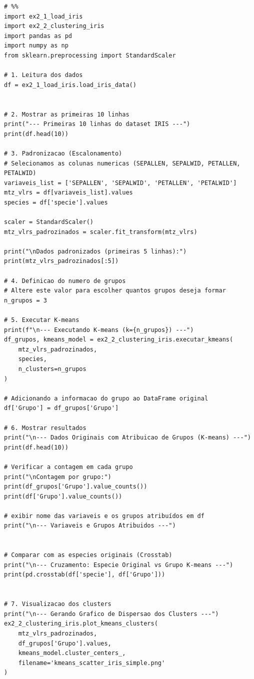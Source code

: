 \documentclass[11pt]{article}
\begin{document}
\begin{verbatim}
# %%
import ex2_1_load_iris
import ex2_2_clustering_iris
import pandas as pd
import numpy as np
from sklearn.preprocessing import StandardScaler

# 1. Leitura dos dados
df = ex2_1_load_iris.load_iris_data()


# 2. Mostrar as primeiras 10 linhas
print("--- Primeiras 10 linhas do dataset IRIS ---")
print(df.head(10))

# 3. Padronizacao (Escalonamento)
# Selecionamos as colunas numericas (SEPALLEN, SEPALWID, PETALLEN, PETALWID)
variaveis_list = ['SEPALLEN', 'SEPALWID', 'PETALLEN', 'PETALWID']
mtz_vlrs = df[variaveis_list].values
species = df['specie'].values

scaler = StandardScaler()
mtz_vlrs_padrozinados = scaler.fit_transform(mtz_vlrs)

print("\nDados padronizados (primeiras 5 linhas):")
print(mtz_vlrs_padrozinados[:5])

# 4. Definicao do numero de grupos
# Altere este valor para escolher quantos grupos deseja formar
n_grupos = 3

# 5. Executar K-means
print(f"\n--- Executando K-means (k={n_grupos}) ---")
df_grupos, kmeans_model = ex2_2_clustering_iris.executar_kmeans(
    mtz_vlrs_padrozinados, 
    species, 
    n_clusters=n_grupos
)

# Adicionando a informacao do grupo ao DataFrame original
df['Grupo'] = df_grupos['Grupo']

# 6. Mostrar resultados
print("\n--- Dados Originais com Atribuicao de Grupos (K-means) ---")
print(df.head(10))

# Verificar a contagem em cada grupo
print("\nContagem por grupo:")
print(df_grupos['Grupo'].value_counts())
print(df['Grupo'].value_counts())

# exibir nome das variaveis e os grupos atribuídos em df
print("\n--- Variaveis e Grupos Atribuidos ---")


# Comparar com as especies originais (Crosstab)
print("\n--- Cruzamento: Especie Original vs Grupo K-means ---")
print(pd.crosstab(df['specie'], df['Grupo']))


# 7. Visualizacao dos clusters
print("\n--- Gerando Grafico de Dispersao dos Clusters ---")
ex2_2_clustering_iris.plot_kmeans_clusters(
    mtz_vlrs_padrozinados, 
    df_grupos['Grupo'].values, 
    kmeans_model.cluster_centers_,
    filename='kmeans_scatter_iris_simple.png'
)


\end{verbatim}
\end{document}

